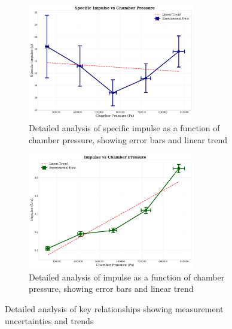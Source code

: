 \documentclass[12pt,a4paper]{article}
\begin{document}
\begin{figure}[H]
\centering
\begin{subfigure}{\textwidth}
    \centering
    \includegraphics[width=0.8\textwidth]{specific_impulse_vs_pressure}
    \caption{Detailed analysis of specific impulse as a function of chamber pressure, showing error bars and linear trend}
    \label{fig:specific_impulse_new}
\end{subfigure}

\vspace{1cm}

\begin{subfigure}{\textwidth}
    \centering
    \includegraphics[width=0.8\textwidth]{impulse_vs_pressure}
    \caption{Detailed analysis of impulse as a function of chamber pressure, showing error bars and linear trend}
    \label{fig:impulse_new}
\end{subfigure}
\caption{Detailed analysis of key relationships showing measurement uncertainties and trends}
\label{fig:detailed_analysis_new}
\end{figure}
\end{document}
